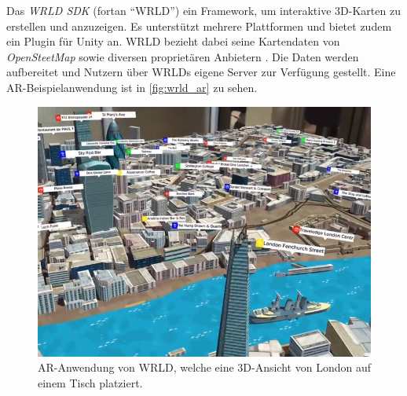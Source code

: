 Das \emph{WRLD SDK} (fortan \enquote{WRLD}) ein Framework, um interaktive 3D-Karten zu erstellen und anzuzeigen.
Es unterstützt mehrere Plattformen und bietet zudem ein Plugin für Unity an.
WRLD bezieht dabei seine Kartendaten von \emph{OpenSteetMap} sowie diversen proprietären Anbietern \parencite{WRLD2018}.
Die Daten werden aufbereitet und Nutzern über WRLDs eigene Server zur Verfügung gestellt.
Eine AR-Beispielanwendung ist in \autoref{fig:wrld_ar} zu sehen.
\begin{figure}
    \centering
    \includegraphics[width=\textwidth]{figures/wrld_ar-web-11}
    \caption{AR-Anwendung von WRLD, welche eine 3D-Ansicht von London auf einem Tisch platziert. }
    \label{fig:wrld_ar}
\end{figure}

